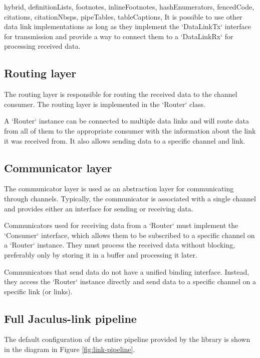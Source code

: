 \begin{markdown*}{%
  hybrid,
  definitionLists,
  footnotes,
  inlineFootnotes,
  hashEnumerators,
  fencedCode,
  citations,
  citationNbsps,
  pipeTables,
  tableCaptions,
}
It is possible to use other data link implementations as long as they implement the `DataLinkTx` interface for transmission and provide a way to connect them to a `DataLinkRx` for processing received data.

\subsection{Routing layer}

The routing layer is responsible for routing the received data to the channel consumer. The routing layer is implemented in the `Router` class.

A `Router` instance can be connected to multiple data links and will route data from all of them to the appropriate consumer with the information about the link it was received from. It also allows sending data to a specific channel and link.

\subsection{Communicator layer}

The communicator layer is used as an abstraction layer for communicating through channels. Typically, the communicator is associated with a single channel and provides either an interface for sending or receiving data.

Communicators used for receiving data from a `Router` must implement the `Consumer` interface, which allows them to be subscribed to a specific channel on a `Router` instance. They must process the received data without blocking, preferably only by storing it in a buffer and processing it later.

Communicators that send data do not have a unified binding interface. Instead, they access the `Router` instance directly and send data to a specific channel on a specific link (or links).

\subsection{Full Jaculus-link pipeline}

The default configuration of the entire pipeline provided by the library is shown in the diagram in Figure \ref{fig:link-pipeline}.


\end{markdown*}
